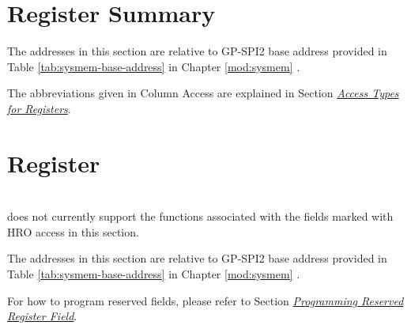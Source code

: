 \documentclass[main\_\_EN.tex]{subfiles}
\begin{document}
\hypertarget{spi-reg-summ}{}
\section{Register Summary}
\label{sec:spi2-reg-summ}

The addresses in this section are relative to GP-SPI2 base address provided in Table \ref{tab:sysmem-base-address} in Chapter \ref{mod:sysmem} \textit{}.

The abbreviations given in Column Access are explained in Section \hyperref[glossary-access-types]{\textit{Access Types for Registers}}.


\section{Register}

\begin{importantlisting}\\
\chipname{} does not currently support the functions associated with the fields marked with HRO access in this section.
\end{importantlisting}

The addresses in this section are relative to GP-SPI2 base address provided in Table \ref{tab:sysmem-base-address} in Chapter \ref{mod:sysmem} \textit{}.

For how to program reserved fields, please refer to Section \hyperref[programming-reserved-field]{\textit{Programming Reserved Register Field}}.


\end{document}
